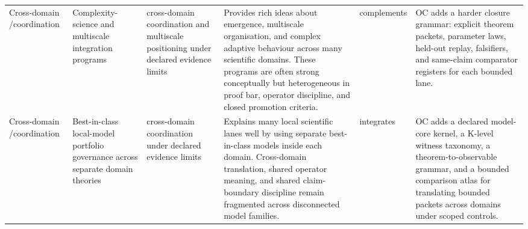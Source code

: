 \begin{longtable}{@{}L{0.09\textwidth}L{0.14\textwidth}L{0.12\textwidth}L{0.23\textwidth}L{0.12\textwidth}L{0.22\textwidth}@{}}
Cross-domain /\allowbreak coordination & Complexity-science and multiscale integration programs & cross-domain coordination and multiscale positioning under declared evidence limits & Provides rich ideas about emergence, multiscale organisation, and complex adaptive behaviour across many scientific domains. \allowbreak These programs are often strong conceptually but heterogeneous in proof bar, operator discipline, and closed promotion criteria. & complements & OC adds a harder closure grammar: explicit theorem packets, parameter laws, held-out replay, falsifiers, and same-claim comparator registers for each bounded lane. \\
Cross-domain /\allowbreak coordination & Best-in-class local-model portfolio governance across separate domain theories & cross-domain coordination under declared evidence limits & Explains many local scientific lanes well by using separate best-in-class models inside each domain. \allowbreak Cross-domain translation, shared operator meaning, and shared claim-boundary discipline remain fragmented across disconnected model families. & integrates & OC adds a declared model-core kernel, a K-level witness taxonomy, a theorem-to-observable grammar, and a bounded comparison atlas for translating bounded packets across domains under scoped controls. \\
\bottomrule
\end{longtable}

